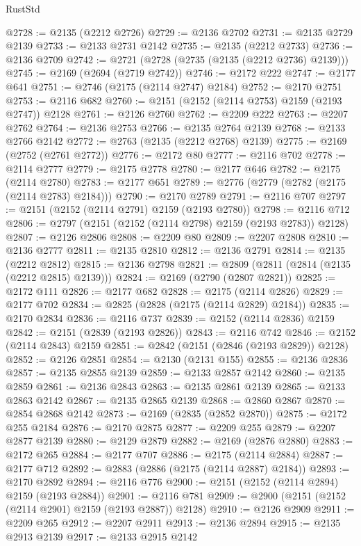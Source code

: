 \begin{lexlean}{RustStd}
\begin{coremodule}
@2728 := @2135 (@2212 @2726)
@2729 := @2136 @2702
@2731 := @2135 @2729 @2139
@2733 := @2133 @2731 @2142
@2735 := @2135 (@2212 @2733)
@2736 := @2136 @2709
@2742 := @2721 (@2728 (@2735 (@2135 (@2212 @2736) @2139)))
@2745 := @2169 (@2694 (@2719 @2742))
@2746 := @2172 @222
@2747 := @2177 @641
@2751 := @2746 (@2175 (@2114 @2747) @2184)
@2752 := @2170 @2751
@2753 := @2116 @682
@2760 := @2151 (@2152 (@2114 @2753) @2159 (@2193 @2747)) @2128
@2761 := @2126 @2760
@2762 := @2209 @222
@2763 := @2207 @2762
@2764 := @2136 @2753
@2766 := @2135 @2764 @2139
@2768 := @2133 @2766 @2142
@2772 := @2763 (@2135 (@2212 @2768) @2139)
@2775 := @2169 (@2752 (@2761 @2772))
@2776 := @2172 @80
@2777 := @2116 @702
@2778 := @2114 @2777
@2779 := @2175 @2778
@2780 := @2177 @646
@2782 := @2175 (@2114 @2780)
@2783 := @2177 @651
@2789 := @2776 (@2779 (@2782 (@2175 (@2114 @2783) @2184)))
@2790 := @2170 @2789
@2791 := @2116 @707
@2797 := @2151 (@2152 (@2114 @2791) @2159 (@2193 @2780))
@2798 := @2116 @712
@2806 := @2797 (@2151 (@2152 (@2114 @2798) @2159 (@2193 @2783)) @2128)
@2807 := @2126 @2806
@2808 := @2209 @80
@2809 := @2207 @2808
@2810 := @2136 @2777
@2811 := @2135 @2810
@2812 := @2136 @2791
@2814 := @2135 (@2212 @2812)
@2815 := @2136 @2798
@2821 := @2809 (@2811 (@2814 (@2135 (@2212 @2815) @2139)))
@2824 := @2169 (@2790 (@2807 @2821))
@2825 := @2172 @111
@2826 := @2177 @682
@2828 := @2175 (@2114 @2826)
@2829 := @2177 @702
@2834 := @2825 (@2828 (@2175 (@2114 @2829) @2184))
@2835 := @2170 @2834
@2836 := @2116 @737
@2839 := @2152 (@2114 @2836) @2159
@2842 := @2151 (@2839 (@2193 @2826))
@2843 := @2116 @742
@2846 := @2152 (@2114 @2843) @2159
@2851 := @2842 (@2151 (@2846 (@2193 @2829)) @2128)
@2852 := @2126 @2851
@2854 := @2130 (@2131 @155)
@2855 := @2136 @2836
@2857 := @2135 @2855 @2139
@2859 := @2133 @2857 @2142
@2860 := @2135 @2859
@2861 := @2136 @2843
@2863 := @2135 @2861 @2139
@2865 := @2133 @2863 @2142
@2867 := @2135 @2865 @2139
@2868 := @2860 @2867
@2870 := @2854 @2868 @2142
@2873 := @2169 (@2835 (@2852 @2870))
@2875 := @2172 @255 @2184
@2876 := @2170 @2875
@2877 := @2209 @255
@2879 := @2207 @2877 @2139
@2880 := @2129 @2879
@2882 := @2169 (@2876 @2880)
@2883 := @2172 @265
@2884 := @2177 @707
@2886 := @2175 (@2114 @2884)
@2887 := @2177 @712
@2892 := @2883 (@2886 (@2175 (@2114 @2887) @2184))
@2893 := @2170 @2892
@2894 := @2116 @776
@2900 := @2151 (@2152 (@2114 @2894) @2159 (@2193 @2884))
@2901 := @2116 @781
@2909 := @2900 (@2151 (@2152 (@2114 @2901) @2159 (@2193 @2887)) @2128)
@2910 := @2126 @2909
@2911 := @2209 @265
@2912 := @2207 @2911
@2913 := @2136 @2894
@2915 := @2135 @2913 @2139
@2917 := @2133 @2915 @2142

\end{coremodule}
\end{lexlean}
